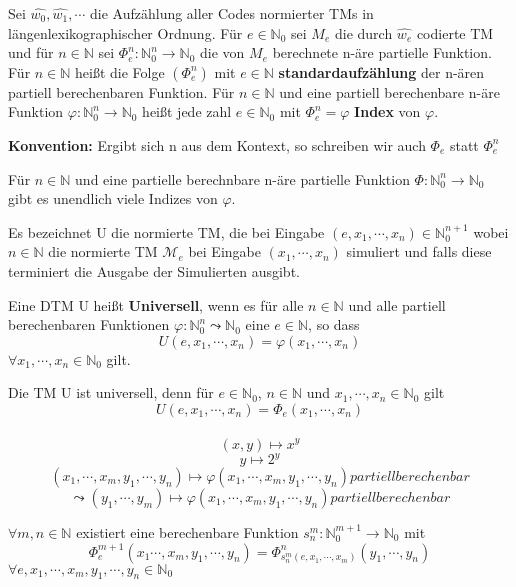  Sei $\hat{w_0}, \hat{w_1}, \cdots$ die Aufzählung aller Codes normierter TMs in längenlexikographischer Ordnung. Für $e \in \mathbb{N}_0$ sei $M_e$ die durch $\hat{w_e}$ codierte TM und für $n \in \mathbb{N}$ sei $\Phi_e^n : \mathbb{N}_0^n \rightarrow \mathbb{N}_0$ die von $M_e$ berechnete n-äre partielle Funktion. Für $n \in \mathbb{N}$ heißt die Folge $(\Phi_e^n)$ mit $e\in \mathbb{N}$ \textbf{standardaufzählung} der n-ären partiell berechenbaren Funktion. Für $n \in \mathbb{N} $ und eine partiell berechenbare n-äre Funktion $\varphi: \mathbb{N}_0^n \rightarrow \mathbb{N}_0$ heißt jede zahl $e \in \mathbb{N}_0$ mit $\Phi_e^n = \varphi$ \textbf{Index} von $\varphi$.

\textbf{Konvention: } Ergibt sich n aus dem Kontext, so schreiben wir auch $\Phi_e$ statt $\Phi_e^n$

 Für $n \in \mathbb{N}$ und eine partielle berechnbare n-äre partielle Funktion $\Phi : \mathbb{N}_0^n \rightarrow \mathbb{N}_0$ gibt es unendlich viele Indizes von $\varphi$.

 Es bezeichnet U die normierte TM, die bei Eingabe $(e, x_1, \cdots, x_n) \in \mathbb{N}_0^{n+1}$ wobei $n \in \mathbb{N}$ die normierte TM $\mathcal{M}_e$ bei Eingabe $(x_1, \cdots, x_n)$ simuliert und falls diese terminiert die Ausgabe der Simulierten ausgibt.

 Eine DTM U heißt \textbf{Universell}, wenn es für alle $n \in \mathbb{N}$ und alle partiell berechenbaren Funktionen $\varphi : \mathbb{N}_0^n \leadsto \mathbb{N}_0$ eine $e \in \mathbb{N}$, so dass \[U(e, x_1, \cdots, x_n) = \varphi(x_1, \cdots, x_n)\] $\forall x_1, \cdots, x_n \in \mathbb{N}_0$ gilt.

 \sloppy Die TM U ist universell, denn für $e \in \mathbb{N}_0$, $n \in \mathbb{N}$ und $x_1, \cdots, x_n \in \mathbb{N}_0$ gilt \[U(e,x_1, \cdots, x_n) = \Phi_e(x_1, \cdots, x_n)\]\\ \[(x, y) \mapsto x^y\] \[y \mapsto 2^y\] \[(x_1, \cdots, x_m, y_1, \cdots, y_n) \mapsto \varphi(x_1, \cdots, x_m, y_1, \cdots, y_n) partiell berechenbar\] \[\leadsto (y_1,\cdots, y_m) \mapsto \varphi(x_1, \cdots, x_m, y_1, \cdots, y_n) partiell berechenbar \]

$\forall m, n \in \mathbb{N}$ existiert eine berechenbare Funktion $s_n^m : \mathbb{N}_0^{m+1} \to \mathbb{N}_0$  mit \[\Phi_e^{m+1}(x_1\cdots, x_m, y_1, \cdots, y_n) = \Phi_{s_n^m(e, x_1, \cdots, x_m)}^n (y_1, \cdots, y_n)\] $\forall e, x_1, \cdots, x_m, y_1, \cdots, y_n \in \mathbb{N}_0$

